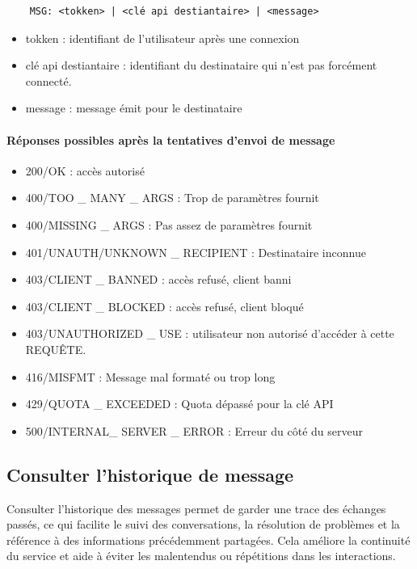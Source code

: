 \documentclass{report}
\begin{document}
\begin{verbatim}
	MSG: <tokken> | <clé api destiantaire> | <message>
\end{verbatim}

\begin{itemize}
	\item tokken : identifiant de l'utilisateur après une connexion
	\item clé api destiantaire : identifiant du destinataire qui n'est pas forcément connecté.
	\item message : message émit pour le destinataire
\end{itemize}

\paragraph{Réponses possibles après la tentatives d'envoi de message}

\begin{itemize}
	\item 200/OK : accès autorisé
	\item 400/TOO \_ MANY \_ ARGS : Trop de paramètres fournit
	\item 400/MISSING \_ ARGS : Pas assez de paramètres fournit
	\item 401/UNAUTH/UNKNOWN \_ RECIPIENT : Destinataire inconnue
	\item 403/CLIENT \_ BANNED : accès refusé, client banni
	\item 403/CLIENT \_ BLOCKED : accès refusé, client bloqué
	\item 403/UNAUTHORIZED \_ USE : utilisateur non autorisé d'accéder à cette REQUÊTE.
	\item 416/MISFMT : Message mal formaté ou trop long
	\item 429/QUOTA \_ EXCEEDED : Quota dépassé pour la clé API
	\item 500/INTERNAL\_ SERVER \_ ERROR : Erreur du côté du serveur
\end{itemize}

\subsection{Consulter l’historique de message}

Consulter l’historique des messages permet de garder une trace des échanges passés, ce qui facilite le suivi des conversations, la résolution de problèmes et la référence à des informations précédemment partagées. Cela améliore la continuité du service et aide à éviter les malentendus ou répétitions dans les interactions.
\end{document}
